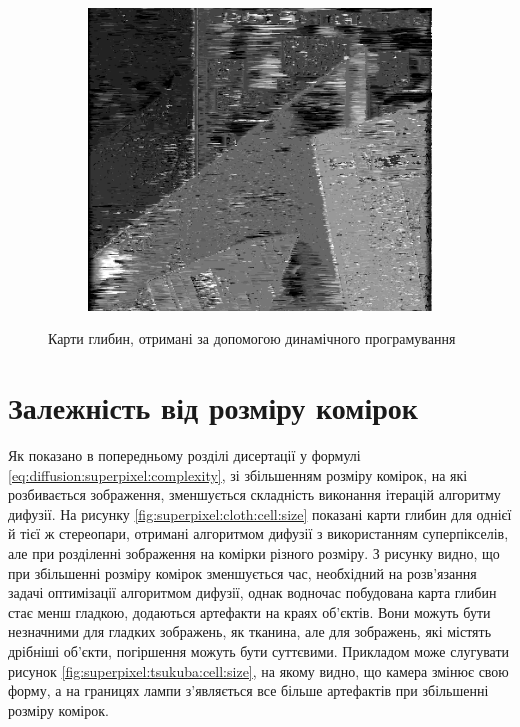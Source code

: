\begin{figure}[h]
\begin{subfigure}[t]{0.32\textwidth}
    \end{subfigure}
    \hfill
    \begin{subfigure}[t]{0.32\textwidth}
        \centering
        \includegraphics[width=\textwidth]{images/poster_dynamic_result}
    \end{subfigure}
    \caption{Карти глибин, отримані за допомогою динамічного програмування}
    \label{fig:result:dynamic}
\end{figure}

\section{Залежність від розміру комірок}

Як показано в попередньому розділі дисертації у формулі
\eqref{eq:diffusion:superpixel:complexity},
зі збільшенням розміру комірок, на які розбивається зображення,
зменшується складність виконання ітерацій алгоритму дифузії.
На рисунку \ref{fig:superpixel:cloth:cell:size}
показані карти глибин для однієї й тієї ж стереопари,
отримані алгоритмом дифузії з використанням суперпікселів,
але при розділенні зображення на комірки різного розміру.
З рисунку видно, що при збільшенні розміру комірок зменшується час,
необхідний на розв'язання задачі оптимізації алгоритмом дифузії,
однак водночас побудована карта глибин стає менш гладкою,
додаються артефакти на краях об'єктів.
Вони можуть бути незначними для гладких зображень, як тканина,
але для зображень, які містять дрібніші об'єкти,
погіршення можуть бути суттєвими.
Прикладом може слугувати рисунок \ref{fig:superpixel:tsukuba:cell:size},
на якому видно, що камера змінює свою форму,
а на границях лампи з'являється все більше артефактів при збільшенні розміру комірок.

